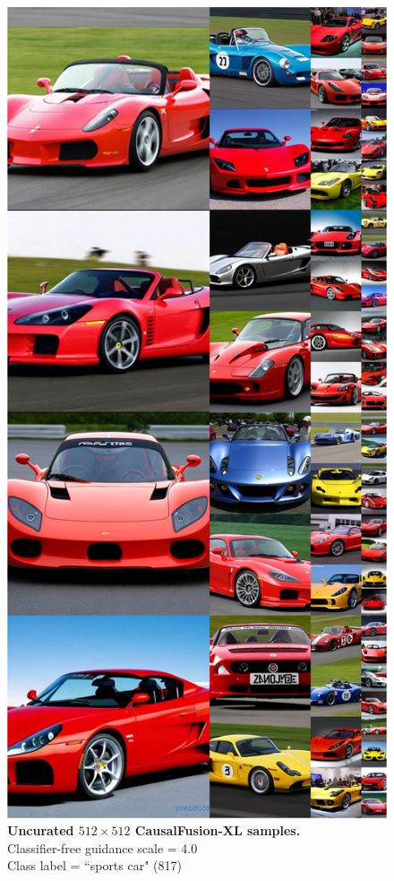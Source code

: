 \begin{figure}\centering
\includegraphics[width=\linewidth]{figs/xl512_817_cfg4.0.jpg}
\caption{\textbf{Uncurated $512\times512$ CausalFusion-XL samples.} \\Classifier-free guidance scale = 4.0\\Class label = ``sports car" (817)}\vspace{-2mm}
\label{fig:samples512_3}
\end{figure}


